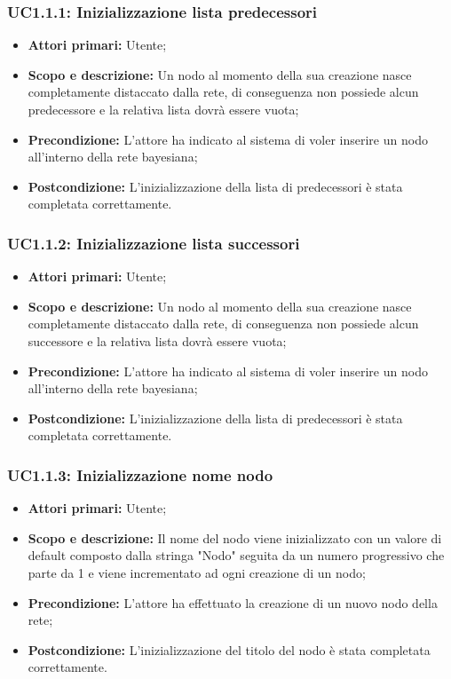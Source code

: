 \subsubsection{UC1.1.1: Inizializzazione lista predecessori} 
\begin{itemize} 
	\item{\textbf{Attori primari:} Utente;} 
	\item{\textbf{Scopo e descrizione:} Un nodo al momento della sua creazione nasce completamente distaccato dalla rete, di conseguenza non possiede alcun predecessore e la relativa lista dovrà essere vuota;} 
	\item{\textbf{Precondizione:} L'attore ha indicato al sistema di voler inserire un nodo all'interno della rete bayesiana;} 
	\item{\textbf{Postcondizione:} L'inizializzazione della lista di predecessori è stata completata correttamente.} 
\end{itemize} 
\subsubsection{UC1.1.2: Inizializzazione lista successori} 
\begin{itemize} 
	\item{\textbf{Attori primari:} Utente;} 
	\item{\textbf{Scopo e descrizione:} Un nodo al momento della sua creazione nasce completamente distaccato dalla rete, di conseguenza non possiede alcun successore e la relativa lista dovrà essere vuota;} 
	\item{\textbf{Precondizione:} L'attore ha indicato al sistema di voler inserire un nodo all'interno della rete bayesiana;} 
	\item{\textbf{Postcondizione:} L'inizializzazione della lista di predecessori è stata completata correttamente.} 
\end{itemize} 
\subsubsection{UC1.1.3: Inizializzazione nome nodo} 
\begin{itemize} 
	\item{\textbf{Attori primari:} Utente;} 
	\item{\textbf{Scopo e descrizione:} Il nome del nodo viene inizializzato con un valore di default composto dalla stringa "Nodo" seguita da un numero progressivo che parte da 1 e viene incrementato ad ogni creazione di un nodo;} 
	\item{\textbf{Precondizione:} L'attore ha effettuato la creazione di un nuovo nodo della rete;} 
	\item{\textbf{Postcondizione:} L'inizializzazione del titolo del nodo è stata completata correttamente.} 
\end{itemize} 

